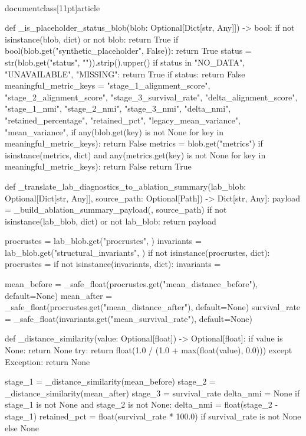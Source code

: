 \\documentclass[11pt]{article}
\begin{document}
\begin{CodeBlock}
def _is_placeholder_status_blob(blob: Optional[Dict[str, Any]]) -> bool:
    if not isinstance(blob, dict) or not blob:
        return True
    if bool(blob.get("synthetic_placeholder", False)):
        return True
    status = str(blob.get("status", "")).strip().upper()
    if status in {"NO_DATA", "UNAVAILABLE", "MISSING"}:
        return True
    if status:
        return False
    meaningful_metric_keys = {
        "stage_1_alignment_score",
        "stage_2_alignment_score",
        "stage_3_survival_rate",
        "delta_alignment_score",
        "stage_1_nmi",
        "stage_2_nmi",
        "stage_3_nmi",
        "delta_nmi",
        "retained_percentage",
        "retained_pct",
        "legacy_mean_variance",
        "mean_variance",
    }
    if any(blob.get(key) is not None for key in meaningful_metric_keys):
        return False
    metrics = blob.get("metrics")
    if isinstance(metrics, dict) and any(metrics.get(key) is not None for key in meaningful_metric_keys):
        return False
    return True


def _translate_lab_diagnostics_to_ablation_summary(lab_blob: Optional[Dict[str, Any]], source_path: Optional[Path]) -> Dict[str, Any]:
    payload = _build_ablation_summary_payload({}, source_path)
    if not isinstance(lab_blob, dict) or not lab_blob:
        return payload

    procrustes = lab_blob.get("procrustes", {})
    invariants = lab_blob.get("structural_invariants", {})
    if not isinstance(procrustes, dict):
        procrustes = {}
    if not isinstance(invariants, dict):
        invariants = {}

    mean_before = _safe_float(procrustes.get("mean_distance_before"), default=None)
    mean_after = _safe_float(procrustes.get("mean_distance_after"), default=None)
    survival_rate = _safe_float(invariants.get("mean_survival_rate"), default=None)

    def _distance_similarity(value: Optional[float]) -> Optional[float]:
        if value is None:
            return None
        try:
            return float(1.0 / (1.0 + max(float(value), 0.0)))
        except Exception:
            return None

    stage_1 = _distance_similarity(mean_before)
    stage_2 = _distance_similarity(mean_after)
    stage_3 = survival_rate
    delta_nmi = None
    if stage_1 is not None and stage_2 is not None:
        delta_nmi = float(stage_2 - stage_1)
    retained_pct = float(survival_rate * 100.0) if survival_rate is not None else None


\end{CodeBlock}
\end{document}
